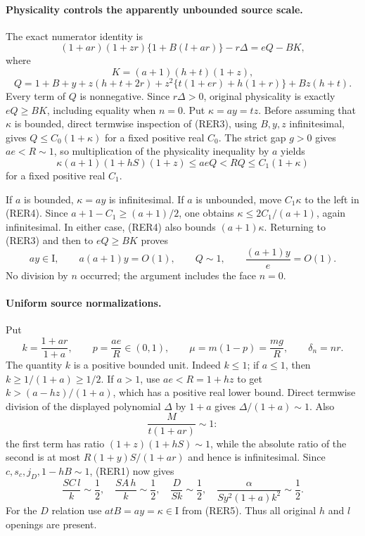 \paragraph{Physicality controls the apparently unbounded source scale.}
The exact numerator identity is
\[
 (1+ar)(1+zr)\{1+B(l+ar)\}-r\Delta=eQ-BK,                \tag{RER2}
\]
where
\[
 K=(a+1)(h+t)(1+z),
\]
\[
 Q=1+B+y+z(h+t+2r)
       +z^2\{t(1+er)+h(1+r)\}+Bz(h+t).                 \tag{RER3}
\]
Every term of $Q$ is nonnegative.  Since $r\Delta>0$, original
physicality is exactly $eQ\geq BK$, including equality when $n=0$.
Put $\kappa=ay=tz$.  Before assuming that $\kappa$ is bounded, direct
termwise inspection of (RER3), using $B,y,z$ infinitesimal, gives
$Q\leq C_0(1+\kappa)$ for a fixed positive real $C_0$.
The strict gap $g>0$ gives $ae<R\sim1$, so multiplication of the
physicality inequality by $a$ yields
\[
 \kappa(a+1)(1+hS)(1+z)\leq aeQ<RQ
                                      \leq C_1(1+\kappa)           \tag{RER4}
\]
for a fixed positive real $C_1$.

If $a$ is bounded, $\kappa=ay$ is infinitesimal.  If $a$ is unbounded,
move $C_1\kappa$ to the left in (RER4).  Since
$a+1-C_1\geq(a+1)/2$, one obtains
$\kappa\leq2C_1/(a+1)$, again infinitesimal.  In either case,
(RER4) also bounds $(a+1)\kappa$.  Returning to (RER3) and then to
$eQ\geq BK$ proves
\[
 ay\in\mathrm I,\qquad a(a+1)y=O(1),\qquad Q\sim1,
 \qquad \frac{(a+1)y}{e}=O(1).                         \tag{RER5}
\]
No division by $n$ occurred; the argument includes the face $n=0$.

\paragraph{Uniform source normalizations.}
Put
\[
 k=\frac{1+ar}{1+a},\qquad p=\frac{ae}{R}\in(0,1),
 \qquad \mu=m(1-p)=\frac{mg}{R},\qquad\delta_n=nr.
\]
The quantity $k$ is a positive bounded unit.  Indeed $k\leq1$; if
$a\leq1$, then $k\geq1/(1+a)\geq1/2$.  If $a>1$, use
$ae<R=1+hz$ to get $k>(a-hz)/(1+a)$, which has a positive real lower
bound.  Direct termwise division of the displayed polynomial
$\Delta$ by $1+a$ gives $\Delta/(1+a)\sim1$.  Also
\[
 \frac{M}{t(1+ar)}\sim1:
\]
the first term has ratio $(1+z)(1+hS)\sim1$, while the absolute
ratio of the second is at most $R(1+y)S/(1+ar)$ and hence is
infinitesimal.  Since $c,s_c,j_D,1-hB\sim1$, (RER1) now gives
\[
 \frac{SC\,l}{k}\sim\frac12,\quad
 \frac{SA\,h}{k}\sim\frac12,\quad
 \frac{D}{Sk}\sim\frac12,\quad
 \frac{\alpha}{Sy^2(1+a)k^2}\sim\frac12.               \tag{RER6}
\]
For the $D$ relation use $atB=ay=\kappa\in\mathrm I$ from
(RER5).  Thus all original $h$ and $l$ openings are present.

